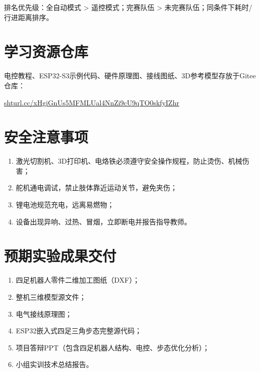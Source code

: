 \documentclass[11pt,a4paper]{article}
\begin{document}
排名优先级：全自动模式 > 遥控模式；完赛队伍 > 未完赛队伍；同条件下耗时/行进距离排序。

\section{学习资源仓库}
电控教程、ESP32-S3示例代码、硬件原理图、接线图纸、3D参考模型存放于Gitee仓库：
\begin{center}
\url{shturl.cc/xHgiGnUs5MFMLUal4NnZi9cU9qTO0skfyIZhr}
\end{center}

\section{安全注意事项}
\begin{enumerate}
    \item 激光切割机、3D打印机、电烙铁必须遵守安全操作规程，防止烫伤、机械伤害；
    \item 舵机通电调试，禁止肢体靠近运动关节，避免夹伤；
    \item 锂电池规范充电，远离易燃物；
    \item 设备出现异响、过热、冒烟，立即断电并报告指导教师。
\end{enumerate}

\section{预期实验成果交付}
\begin{enumerate}
    \item 四足机器人零件二维加工图纸（DXF）；
    \item 整机三维模型源文件；
    \item 电气接线原理图；
    \item ESP32嵌入式四足三角步态完整源代码；
    \item 项目答辩PPT（包含四足机器人结构、电控、步态优化分析）；
    \item 小组实训技术总结报告。
\end{enumerate}
\end{document}
